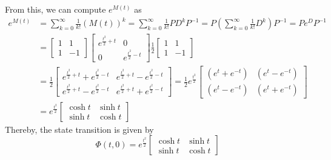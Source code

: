 From this, we can compute \( e^{M(t)} \) as
\begin{align*}
    e^{M(t)}
     & =
    \sum_{k=0}^{\infty} \frac{1}{k!} {(M(t))}^k
    =
    \sum_{k=0}^{\infty} \frac{1}{k!} P D^k P^{-1}
    =
    P \left( \sum_{k=0}^{\infty} \frac{1}{k!} D^k \right) P^{-1}
    =
    P e^D P^{-1}
    \\
     & =
    \begin{bmatrix}
        1 & 1  \\
        1 & -1
    \end{bmatrix}
    \begin{bmatrix}
        e^{\frac{t^2}{2} + t} & 0                     \\
        0                     & e^{\frac{t^2}{2} - t}
    \end{bmatrix}
    \frac{1}{2}
    \begin{bmatrix}
        1 & 1  \\
        1 & -1
    \end{bmatrix}
    \\
     & =
    \frac{1}{2}
    \begin{bmatrix}
        e^{\frac{t^2}{2} + t} + e^{\frac{t^2}{2} - t} & e^{\frac{t^2}{2} + t} - e^{\frac{t^2}{2} - t} \\
        e^{\frac{t^2}{2} + t} - e^{\frac{t^2}{2} - t} & e^{\frac{t^2}{2} + t} + e^{\frac{t^2}{2} - t}
    \end{bmatrix}
    =
    \frac{1}{2} e^{\frac{t^2}{2}}
    \begin{bmatrix}
        (e^t + e^{-t}) & (e^t - e^{-t}) \\
        (e^t - e^{-t}) & (e^t + e^{-t})
    \end{bmatrix}
    \\
     & =
    e^{\frac{t^2}{2}}
    \begin{bmatrix}
        \cosh t & \sinh t \\
        \sinh t & \cosh t
    \end{bmatrix}
\end{align*}
Thereby, the state transition is given by
\begin{equation*}
    \boxed{
        \Phi(t, 0)
        =
        e^{\frac{t^2}{2}}
        \begin{bmatrix}
            \cosh t & \sinh t \\
            \sinh t & \cosh t
        \end{bmatrix}
    }
\end{equation*}

